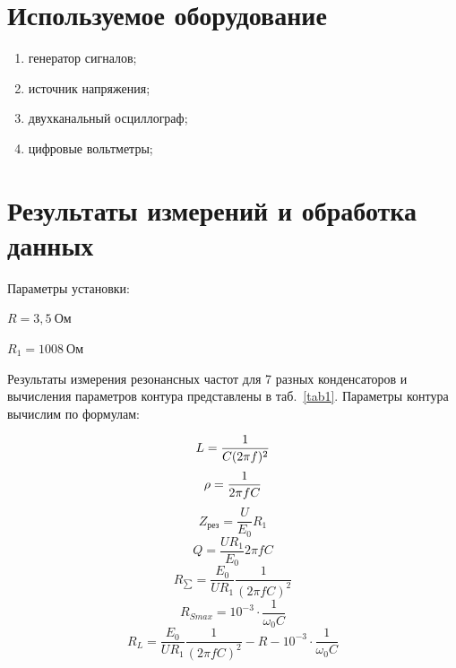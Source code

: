 \documentclass[a4paper, 12pt]{article}
\begin{document}
\section{Используемое оборудование}

\begin{enumerate}
    \item генератор сигналов;
    \item источник напряжения;
    \item двухканальный осциллограф;
    \item цифровые вольтметры;
\end{enumerate}

\section{Результаты измерений и обработка данных}

Параметры установки:
\begin{description}
\item{} $R = 3,5~Ом$
\item{} $R_1 = 1008~Ом$
\end{description}

Результаты измерения резонансных частот для 7 разных конденсаторов и вычисления параметров контура представлены в таб.~\ref{tab1}. Параметры контура вычислим по формулам:

\begin{equation}
L=\frac{1}{C(2\pi f)^2} \\
\end{equation}
\begin{equation}
\rho=\frac{1}{2\pi fC} \\
\end{equation}
\begin{equation}
Z_{\text{рез}}=\frac{U}{E_0}R_1
\end{equation}
\begin{equation}
Q=\frac{UR_1}{E_0}2\pi fC
\end{equation}
\begin{equation}
R_{\sum}=\frac{E_0}{UR_1}\frac{1}{(2\pi fC)^2}
\end{equation}
\begin{equation}
R_{Smax}=10^{-3}\cdot\frac{1}{\omega_0C}
\end{equation}
\begin{equation}
R_L=\frac{E_0}{UR_1}\frac{1}{(2\pi fC)^2}-R-10^{-3}\cdot\frac{1}{\omega_0C}
\end{equation}
\end{document}
